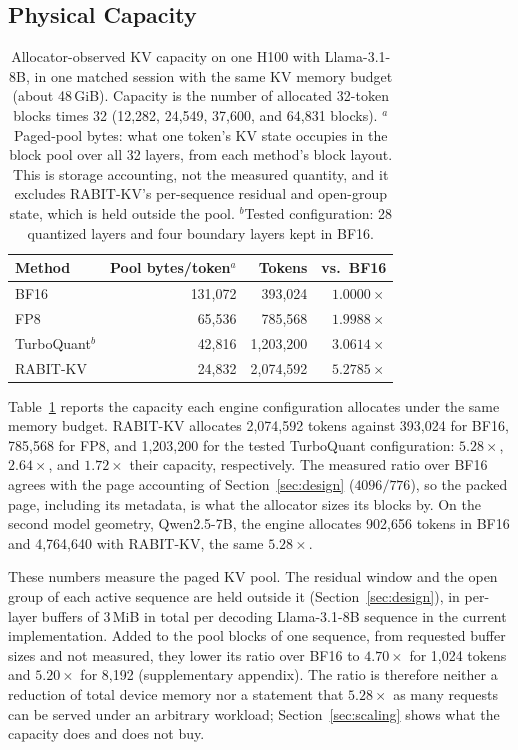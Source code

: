 \documentclass{article}
\begin{document}
\subsection{Physical Capacity}
\label{sec:capacity}

\begin{table}[t]
\centering
\small
\setlength{\tabcolsep}{4pt}
\begin{tabular}{@{}lrrr@{}}
\toprule
Method & Pool bytes/token$^{a}$ & Tokens & vs.\ BF16 \\
\midrule
BF16 & 131,072 & 393,024 & $1.0000\times$ \\
FP8 & 65,536 & 785,568 & $1.9988\times$ \\
TurboQuant$^{b}$ & 42,816 & 1,203,200 & $3.0614\times$ \\
RABIT-KV & 24,832 & 2,074,592 & $5.2785\times$ \\
\bottomrule
\end{tabular}
\caption{Allocator-observed KV capacity on one H100 with Llama-3.1-8B, in one matched session with the
same KV memory budget (about 48\,GiB). Capacity is the number of allocated 32-token blocks times 32 (12,282, 24,549, 37,600, and 64,831 blocks).
$^{a}$Paged-pool bytes: what one token's KV state occupies in the block pool over all 32 layers, from
each method's block layout. This is storage accounting, not the measured quantity, and it excludes
RABIT-KV's per-sequence residual and open-group state, which is held outside the pool. $^{b}$Tested configuration: 28
quantized layers and four boundary layers kept in BF16.}
\label{tab:capacity}
\end{table}

Table~\ref{tab:capacity} reports the capacity each engine configuration allocates under the same memory
budget. RABIT-KV allocates 2,074,592 tokens against 393,024 for BF16, 785,568 for FP8, and 1,203,200
for the tested TurboQuant configuration: $5.28\times$, $2.64\times$, and $1.72\times$ their
capacity, respectively. The measured ratio over BF16 agrees with the page accounting of
Section~\ref{sec:design} ($4096/776$), so the packed page, including its metadata, is what the
allocator sizes its blocks by. On the second model geometry, Qwen2.5-7B, the engine allocates 902,656
tokens in BF16 and 4,764,640 with RABIT-KV, the same $5.28\times$.

These numbers measure the paged KV pool. The residual window and the open group of each active
sequence are held outside it (Section~\ref{sec:design}), in per-layer buffers of 3\,MiB in total per
decoding Llama-3.1-8B sequence in the current implementation. Added to the pool blocks of one sequence,
from requested buffer sizes and not measured, they lower its ratio over BF16 to $4.70\times$ for 1,024
tokens and $5.20\times$ for 8,192 (supplementary appendix). The ratio is therefore neither a reduction of
total device memory nor a statement that $5.28\times$ as many requests can be served under an arbitrary
workload; Section~\ref{sec:scaling} shows what the capacity does and does not buy.
\end{document}
